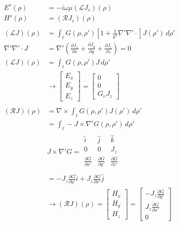 \documentclass{article}
\newcommand{\0}{\varnothing}
\begin{document}
\begin{minipage}{0.45\textwidth}
\begin{align*}
    E^s(\rho) &= -i\omega\mu(\mathcal{L}J_s)(\rho)\\
    H^s(\rho) &= (\mathcal{R}J_s)(\rho) \\ \\
    (\mathcal{L}J)(\rho) &= \int_{\ell}G(\rho,\rho')[1+\frac{1}{k^2}\nabla'\nabla'\cdotp]J(\rho') \,d\rho'\\
    \nabla'\nabla'\cdotp J &= \nabla' (\frac{\partial J_x}{\partial x} + \frac{\partial J_y}{\partial y} + \frac{\partial J_z}{\partial z}) = 0\\
    (\mathcal{L}J)(\rho) &= \int_{\ell}G(\rho,\rho') J\,d\rho'\\
    &\rightarrow 
    \left[ \begin{array}{c} E_x \\ E_y \\ E_z \end{array} \right] = 
    \left[ \begin{array}{c} 0 \\ 0 \\ G_v J_z \end{array} \right]\\ \\
    (\mathcal{R}J)(\rho) &= \nabla \times \int_{\ell}G(\rho,\rho')J(\rho') \,d\rho'\\
         &= \int_{\ell} - J \times \nabla' G(\rho,\rho') \,d\rho'\\
    & J \times \nabla' G = 
    \begin{array}{|ccc|}
    \hat i & \hat j & \hat k\\
    0 & 0 & J_z \\
    \frac{\partial G}{\partial x'} & \frac{\partial G}{\partial y'} & \frac{\partial G}{\partial z'} \\
    \end{array}\\
    &=  - J_z \frac{\partial G}{\partial y'} \hat i + J_z \frac{\partial G}{\partial x'} \hat j\\
    & \rightarrow (\mathcal{R}J)(\rho) = \left[ \begin{array}{c} H_x \\ H_y \\ H_z \end{array} \right]  = 
      \left[ \begin{array}{c}  -J_z \frac{\partial G}{\partial y'}\\ J_z \frac{\partial G}{\partial x'} \\ 0 \end{array} \right]
\end{align*}
\end{minipage}
\end{document}
